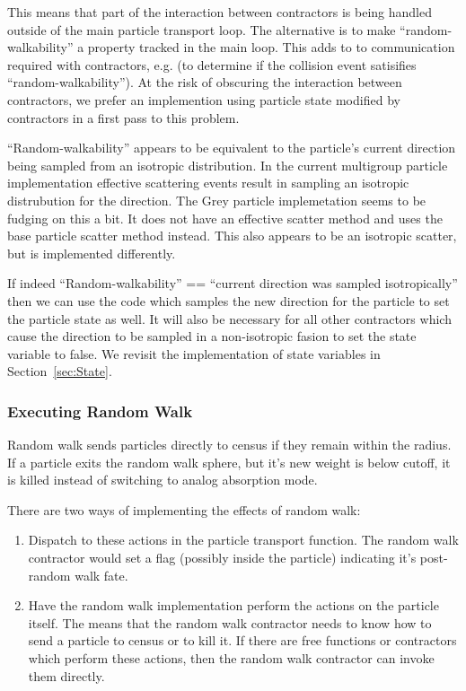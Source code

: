 \documentclass[memo]{ResearchNote}
\begin{document}
This means that part of the interaction between contractors is being
handled outside of the main particle transport loop. The alternative
is to make ``random-walkability'' a property tracked in the main
loop. This adds to to communication required with contractors, e.g. (to
determine if the collision event satisifies
``random-walkability''). At the risk of obscuring the interaction
between contractors, we prefer an implemention using particle state
modified by contractors in a first pass to this problem. 

``Random-walkability'' appears to be equivalent to the particle's
current direction being sampled from an isotropic distribution. In the
current multigroup particle implementation effective scattering events
result in sampling an isotropic distrubution for the direction. The
Grey particle implemetation seems to be fudging on this a bit. It does
not have an effective scatter method and uses the base particle
scatter method instead. This also appears to be an isotropic scatter,
but is implemented differently.

If indeed ``Random-walkability'' == ``current direction was sampled
isotropically'' then we can use the code which samples the new
direction for the particle to set the particle state as well. It will
also be necessary for all other contractors which cause the direction
to be sampled in a non-isotropic fasion to set the state variable to
false. We revisit the implementation of state variables in
Section~\ref{sec:State}. 

\subsubsection{Executing Random Walk}

Random walk sends particles directly to census if they remain within
the radius. If a particle exits the random walk sphere, but it's new
weight is below cutoff, it is killed instead of switching to analog
absorption mode. 

There are two ways of implementing the effects of random walk:
\begin{enumerate}
\item Dispatch to these actions in the particle transport function.
  The random walk contractor would set a flag (possibly inside the
  particle) indicating it's post-random walk fate.
  
\item Have the random walk implementation perform the actions on the
  particle itself. The means that the random walk contractor needs to
  know how to send a particle to census or to kill it. If there are
  free functions or contractors which perform these actions, then the
  random walk contractor can invoke them directly.
\end{enumerate}
\end{document}
